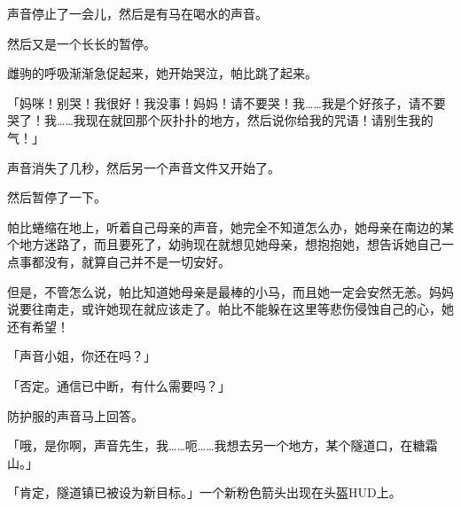 
声音停止了一会儿，然后是有马在喝水的声音。


然后又是一个长长的暂停。


雌驹的呼吸渐渐急促起来，她开始哭泣，帕比跳了起来。

「妈咪！别哭！我很好！我没事！妈妈！请不要哭！我……我是个好孩子，请不要哭了！我……我现在就回那个灰扑扑的地方，然后说你给我的咒语！请别生我的气！」


声音消失了几秒，然后另一个声音文件又开始了。



然后暂停了一下。


帕比蜷缩在地上，听着自己母亲的声音，她完全不知道怎么办，她母亲在南边的某个地方迷路了，而且要死了，幼驹现在就想见她母亲，想抱抱她，想告诉她自己一点事都没有，就算自己并不是一切安好。

但是，不管怎么说，帕比知道她母亲是最棒的小马，而且她一定会安然无恙。妈妈说要往南走，或许她现在就应该走了。帕比不能躲在这里等悲伤侵蚀自己的心，她还有希望！

「声音小姐，你还在吗？」

「{\mt 否定。通信已中断，有什么需要吗？}」

防护服的声音马上回答。

「哦，是你啊，声音先生，我……呃……我想去另一个地方，某个隧道口，在糖霜山。」

「{\mt 肯定，隧道镇已被设为新目标。}」一个新粉色箭头出现在头盔HUD上。

